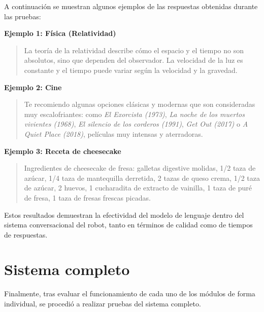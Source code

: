A continuación se muestran algunos ejemplos de las respuestas obtenidas durante las pruebas:

\vspace{0.2cm}

\textbf{Ejemplo 1: Física (Relatividad)}

\begin{quote}
La teoría de la relatividad describe cómo el espacio y el tiempo no son absolutos, sino que dependen del observador. La velocidad de la luz es constante y el tiempo puede variar según la velocidad y la gravedad.
\end{quote}

\vspace{0.2cm}

\textbf{Ejemplo 2: Cine}

\begin{quote}
Te recomiendo algunas opciones clásicas y modernas que son consideradas muy escalofriantes: como \textit{El Exorcista (1973)}, \textit{La noche de los muertos vivientes (1968)}, \textit{El silencio de los corderos (1991)}, \textit{Get Out (2017)} o \textit{A Quiet Place (2018)}, películas muy intensas y aterradoras.
\end{quote}

\vspace{0.2cm}

\textbf{Ejemplo 3: Receta de cheesecake}
\begin{quote}
Ingredientes de cheesecake de fresa: galletas digestive molidas,  1/2 taza de azúcar,  1/4 taza de mantequilla derretida,  2 tazas de queso crema,  1/2 taza de azúcar, 2 huevos,  1 cucharadita de extracto de vainilla, 1 taza de puré de fresa,  1 taza de fresas frescas picadas.

\end{quote}

\vspace{0.2cm}

Estos resultados demuestran la efectividad del modelo de lenguaje dentro del sistema conversacional del robot, tanto en términos de calidad como de tiempos de respuestas.


\section{Sistema completo}
\label{sec:Sistema completo}

Finalmente, tras evaluar el funcionamiento de cada uno de los módulos de forma individual, se procedió a realizar pruebas del sistema completo.

